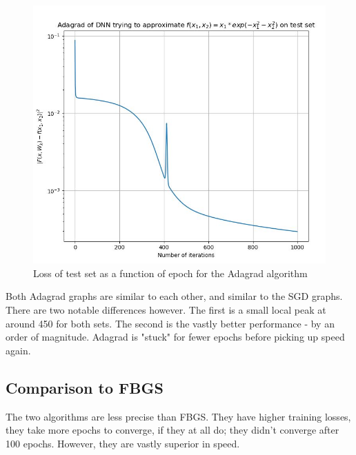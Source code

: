 \documentclass[12pt]{scrartcl}
\begin{document}
\begin{figure}[H]
	\hfill\includegraphics{Adagrad_test_convergence.jpg}\hspace*{\fill}
	\caption{Loss of test set as a function of epoch for the Adagrad algorithm}
\end{figure}

Both Adagrad graphs are similar to each other, and similar to the SGD graphs. There are two notable differences however. The first is a small local peak at around 450 for both sets. The second is the vastly better performance - by an order of magnitude. Adagrad is "stuck" for fewer epochs before picking up speed again.\\

\subsection{Comparison to FBGS}
The two algorithms are less precise than FBGS. They have higher training losses, they take more epochs to converge, if they at all do; they didn't converge after 100 epochs. However, they are vastly superior in speed.
\end{document}
